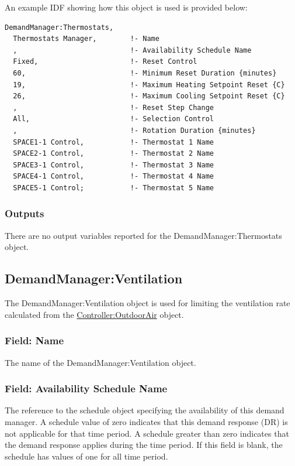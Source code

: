 An example IDF showing how this object is used is provided below:

\begin{lstlisting}
DemandManager:Thermostats,
  Thermostats Manager,        !- Name
  ,                           !- Availability Schedule Name
  Fixed,                      !- Reset Control
  60,                         !- Minimum Reset Duration {minutes}
  19,                         !- Maximum Heating Setpoint Reset {C}
  26,                         !- Maximum Cooling Setpoint Reset {C}
  ,                           !- Reset Step Change
  All,                        !- Selection Control
  ,                           !- Rotation Duration {minutes}
  SPACE1-1 Control,           !- Thermostat 1 Name
  SPACE2-1 Control,           !- Thermostat 2 Name
  SPACE3-1 Control,           !- Thermostat 3 Name
  SPACE4-1 Control,           !- Thermostat 4 Name
  SPACE5-1 Control;           !- Thermostat 5 Name
\end{lstlisting}

\subsubsection{Outputs}\label{outputs-4-002}

There are no output variables reported for the DemandManager:Thermostats object.

\subsection{DemandManager:Ventilation}\label{demandmanagerventilation}

The DemandManager:Ventilation object is used for limiting the ventilation rate calculated from the \hyperref[controlleroutdoorair]{Controller:OutdoorAir} object.

\subsubsection{Field: Name}\label{field-name-5-006}

The name of the DemandManager:Ventilation object.

\subsubsection{Field: Availability Schedule Name}\label{field-availability-schedule-name-4-000}

The reference to the schedule object specifying the availability of this demand manager. A schedule value of zero indicates that this demand response (DR) is not applicable for that time period. A schedule greater than zero indicates that the demand response applies during the time period. If this field is blank, the schedule has values of one for all time period.

